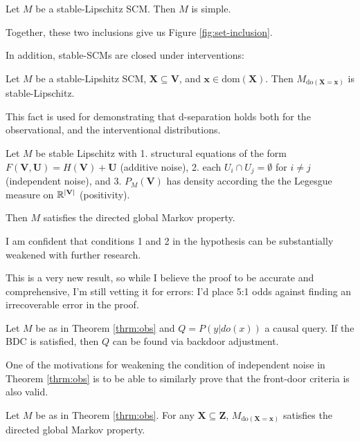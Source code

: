 \documentclass[12pt]{article}
\begin{document}
\begin{theorem} \label{simple-subset}
Let $M$ be a stable-Lipschitz SCM. Then $M$ is simple.
\end{theorem}

Together, these two inclusions give us Figure \ref{fig:set-inclusion}.

In addition, stable-SCMs are closed under interventions:

\begin{theorem} \label{int-closed}
Let $M$ be a stable-Lipshitz SCM, $\mathbf{X}\subseteq\mathbf{V}$, and $\mathbf{x}\in\text{dom}(\mathbf{X})$. Then $M_{\text{do}(\mathbf{X}=\mathbf{x})}$ is stable-Lipschitz.
\end{theorem}
This fact is used for demonstrating that d-separation holds both for the observational, and the interventional distributions.



\begin{theorem} \label{thrm:obs}
Let $M$ be stable Lipschitz with 1. structural equations of the form $F(\mathbf{V},\mathbf{U})=H(\mathbf{V})+\mathbf{U}$ (additive noise), 2. each $U_i\cap U_j=\emptyset$ for $i\neq j$ (independent noise), and 3. $P_M(\mathbf{V})$ has density according the the Legesgue measure on $\mathbb{R}^{|\mathbf{V}|}$ (positivity). 

Then $M$ satisfies the directed global Markov property.
\end{theorem}

I am confident that conditions 1 and 2 in the hypothesis can be substantially weakened with further research.

This is a very new result, so while I believe the proof to be accurate and comprehensive, I'm still vetting it for errors: I'd place 5:1 odds against finding an irrecoverable error in the proof. 

\begin{corollary} \label{adjustment}
Let $M$ be as in Theorem \ref{thrm:obs} and $Q=P(y|do(x))$ a causal query. If the BDC is satisfied, then $Q$ can be found via backdoor adjustment.
\end{corollary}

One of the motivations for weakening the condition of independent noise in Theorem \ref{thrm:obs} is to be able to similarly prove that the front-door criteria is also valid.

\begin{theorem} \label{thrm:int}
Let $M$ be as in Theorem \ref{thrm:obs}. For any $\mathbf{X}\subseteq \mathbf{Z}$, $M_{\text{do}(\mathbf{X}=\mathbf{x})}$ satisfies the directed global Markov property.
\end{theorem}
\end{document}
